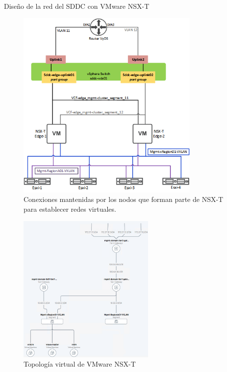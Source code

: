 \begin{subsubsection}{Diseño de la red del SDDC con VMware NSX-T}
\begin{figure}[h]
        \includegraphics[width=0.8\textwidth]{imaxes/pruebaconcepto/estructura_NSX_T.png}
        \caption{Conexiones mantenidas por los nodos que forman parte de NSX-T para establecer redes virtuales.}
        \label{fig:estructura-NSXT}
      \end{figure}
      \FloatBarrier

    \begin{figure}[h]
        \centering
        \includegraphics[width=0.6\textwidth]{imaxes/pruebaconcepto/topologiaTwoTierRouting-Final.png}
        \caption{Topología virtual de VMware NSX-T}
        \label{fig:two-tier-topology} 
    \end{figure}
    \FloatBarrier


\end{subsubsection}
